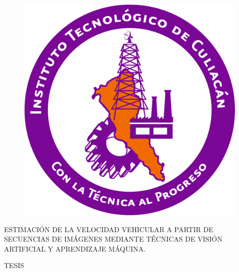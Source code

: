 \begin{titlepage}

    \begin{center}
        
        \vspace*{-0.15cm}
    
        
        \vspace{0.25cm}
        
        \begin{figure}[H]
            \centering
            \includegraphics[scale=0.25]{Portada/logotec.png}
        \end{figure}
        
        \vspace{0.3cm}
        \large{ESTIMACIÓN DE LA VELOCIDAD VEHICULAR A PARTIR DE SECUENCIAS DE IMÁGENES MEDIANTE TÉCNICAS DE VISIÓN ARTIFICIAL Y APRENDIZAJE MÁQUINA.}
        
        \vspace{0.5cm}
        
        \large{TESIS}
        

\end{center}
\end{titlepage}

